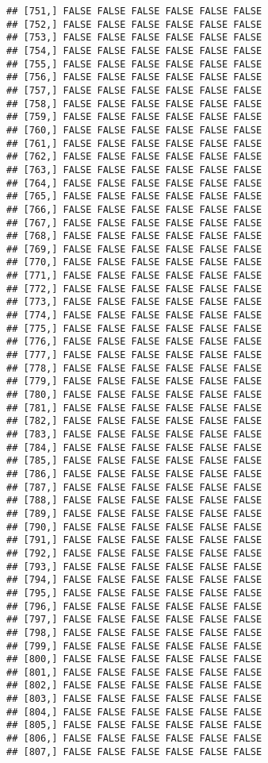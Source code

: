 \documentclass[
]{article}
\begin{document}
\begin{verbatim}
## [751,] FALSE FALSE FALSE FALSE FALSE FALSE
## [752,] FALSE FALSE FALSE FALSE FALSE FALSE
## [753,] FALSE FALSE FALSE FALSE FALSE FALSE
## [754,] FALSE FALSE FALSE FALSE FALSE FALSE
## [755,] FALSE FALSE FALSE FALSE FALSE FALSE
## [756,] FALSE FALSE FALSE FALSE FALSE FALSE
## [757,] FALSE FALSE FALSE FALSE FALSE FALSE
## [758,] FALSE FALSE FALSE FALSE FALSE FALSE
## [759,] FALSE FALSE FALSE FALSE FALSE FALSE
## [760,] FALSE FALSE FALSE FALSE FALSE FALSE
## [761,] FALSE FALSE FALSE FALSE FALSE FALSE
## [762,] FALSE FALSE FALSE FALSE FALSE FALSE
## [763,] FALSE FALSE FALSE FALSE FALSE FALSE
## [764,] FALSE FALSE FALSE FALSE FALSE FALSE
## [765,] FALSE FALSE FALSE FALSE FALSE FALSE
## [766,] FALSE FALSE FALSE FALSE FALSE FALSE
## [767,] FALSE FALSE FALSE FALSE FALSE FALSE
## [768,] FALSE FALSE FALSE FALSE FALSE FALSE
## [769,] FALSE FALSE FALSE FALSE FALSE FALSE
## [770,] FALSE FALSE FALSE FALSE FALSE FALSE
## [771,] FALSE FALSE FALSE FALSE FALSE FALSE
## [772,] FALSE FALSE FALSE FALSE FALSE FALSE
## [773,] FALSE FALSE FALSE FALSE FALSE FALSE
## [774,] FALSE FALSE FALSE FALSE FALSE FALSE
## [775,] FALSE FALSE FALSE FALSE FALSE FALSE
## [776,] FALSE FALSE FALSE FALSE FALSE FALSE
## [777,] FALSE FALSE FALSE FALSE FALSE FALSE
## [778,] FALSE FALSE FALSE FALSE FALSE FALSE
## [779,] FALSE FALSE FALSE FALSE FALSE FALSE
## [780,] FALSE FALSE FALSE FALSE FALSE FALSE
## [781,] FALSE FALSE FALSE FALSE FALSE FALSE
## [782,] FALSE FALSE FALSE FALSE FALSE FALSE
## [783,] FALSE FALSE FALSE FALSE FALSE FALSE
## [784,] FALSE FALSE FALSE FALSE FALSE FALSE
## [785,] FALSE FALSE FALSE FALSE FALSE FALSE
## [786,] FALSE FALSE FALSE FALSE FALSE FALSE
## [787,] FALSE FALSE FALSE FALSE FALSE FALSE
## [788,] FALSE FALSE FALSE FALSE FALSE FALSE
## [789,] FALSE FALSE FALSE FALSE FALSE FALSE
## [790,] FALSE FALSE FALSE FALSE FALSE FALSE
## [791,] FALSE FALSE FALSE FALSE FALSE FALSE
## [792,] FALSE FALSE FALSE FALSE FALSE FALSE
## [793,] FALSE FALSE FALSE FALSE FALSE FALSE
## [794,] FALSE FALSE FALSE FALSE FALSE FALSE
## [795,] FALSE FALSE FALSE FALSE FALSE FALSE
## [796,] FALSE FALSE FALSE FALSE FALSE FALSE
## [797,] FALSE FALSE FALSE FALSE FALSE FALSE
## [798,] FALSE FALSE FALSE FALSE FALSE FALSE
## [799,] FALSE FALSE FALSE FALSE FALSE FALSE
## [800,] FALSE FALSE FALSE FALSE FALSE FALSE
## [801,] FALSE FALSE FALSE FALSE FALSE FALSE
## [802,] FALSE FALSE FALSE FALSE FALSE FALSE
## [803,] FALSE FALSE FALSE FALSE FALSE FALSE
## [804,] FALSE FALSE FALSE FALSE FALSE FALSE
## [805,] FALSE FALSE FALSE FALSE FALSE FALSE
## [806,] FALSE FALSE FALSE FALSE FALSE FALSE
## [807,] FALSE FALSE FALSE FALSE FALSE FALSE

\end{verbatim}
\end{document}
